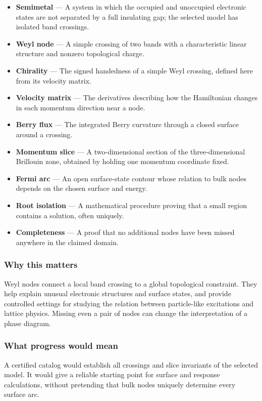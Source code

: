 \documentclass[
  11pt,
]{article}
\begin{document}
\begin{itemize}
\item
  \textbf{Semimetal} --- A system in which the occupied and unoccupied
  electronic states are not separated by a full insulating gap; the
  selected model has isolated band crossings.
\item
  \textbf{Weyl node} --- A simple crossing of two bands with a
  characteristic linear structure and nonzero topological charge.
\item
  \textbf{Chirality} --- The signed handedness of a simple Weyl
  crossing, defined here from its velocity matrix.
\item
  \textbf{Velocity matrix} --- The derivatives describing how the
  Hamiltonian changes in each momentum direction near a node.
\item
  \textbf{Berry flux} --- The integrated Berry curvature through a
  closed surface around a crossing.
\item
  \textbf{Momentum slice} --- A two-dimensional section of the
  three-dimensional Brillouin zone, obtained by holding one momentum
  coordinate fixed.
\item
  \textbf{Fermi arc} --- An open surface-state contour whose relation to
  bulk nodes depends on the chosen surface and energy.
\item
  \textbf{Root isolation} --- A mathematical procedure proving that a
  small region contains a solution, often uniquely.
\item
  \textbf{Completeness} --- A proof that no additional nodes have been
  missed anywhere in the claimed domain.
\end{itemize}

\subsubsection{Why this matters}

Weyl nodes connect a local band crossing to a global topological
constraint. They help explain unusual electronic structures and surface
states, and provide controlled settings for studying the relation
between particle-like excitations and lattice physics. Missing even a
pair of nodes can change the interpretation of a phase diagram.

\subsubsection{What progress would mean}

A certified catalog would establish all crossings and slice invariants
of the selected model. It would give a reliable starting point for
surface and response calculations, without pretending that bulk nodes
uniquely determine every surface arc.
\end{document}
